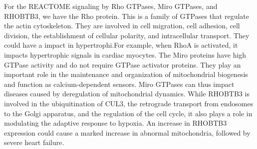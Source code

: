 \documentclass[a4paper, 11pt]{article}
\begin{document}
\begin{multicols}{2}
For the REACTOME signaling by Rho GTPases, Miro GTPases, and RHOBTB3, we have the Rho protein. This is a family of GTPases that regulate the actin cytoskeleton. They are involved in cell migration, cell adhesion, cell division, the establishment of cellular polarity, and intracellular transport\citep{ReactomeSignaling}. They could have a impact in hypertrophi.For example, when RhoA is activated, it impacts hypertrophic signals in cardiac myocytes.\citep{lezoualc2008small}
The Miro proteins have high GTPase activity and do not require GTPase activator proteins. They play an important role in the maintenance and organization of mitochondrial biogenesis and function as calcium-dependent sensors. Miro GTPases can thus impact diseases caused by deregulation of mitochondrial dynamics.\citep{reis2009miro} 
While RHOBTB3 is involved in the ubiquitination of CUL3, the retrograde transport from endosomes to the Golgi apparatus, and the regulation of the cell cycle, it also plays a role in modulating the adaptive response to hypoxia. An increase in RHOBTB3 expression could cause a marked increase in abnormal mitochondria, followed by severe heart failure.\citep{yuasa2007novel} 



\end{multicols}
\end{document}
